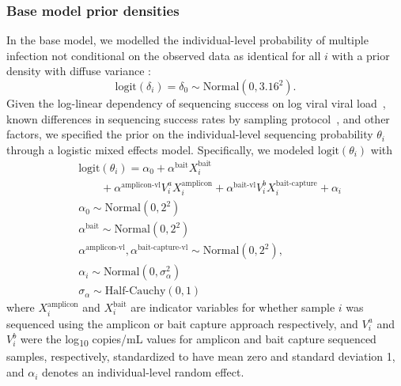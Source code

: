 \documentclass[10pt,letterpaper]{article}
\begin{document}
\subsubsection{Base model prior densities}
In the base model, we modelled the individual-level probability of multiple infection not conditional on the observed data as identical for all $i$ with a prior density with diffuse variance \cite{stan2024}: 
\begin{equation}
\text{logit}\left(\delta_i\right) = \delta_0 \sim \text{Normal}(0,3.16^2).
\label{eq:model_prob_mi}
\end{equation}
Given the log-linear dependency of sequencing success on log viral viral load~\cite{bonsall2020}, known differences in sequencing success rates by sampling protocol~\cite{monod2023}, and other factors, we specified the prior on the individual-level sequencing probability $\theta_i$ through a logistic mixed effects model. Specifically, we modeled $\text{logit}(\theta_i)$ with 
\begin{equation}
\begin{split}
&\text{logit}\left(\theta_i\right) = 
\alpha_0 + \alpha^{\text{bait}} X^{\text{bait}}_i \\
&\quad\quad + \alpha^{\text{amplicon-vl}} V_i^a X^{\text{amplicon}}_i + \alpha^{\text{bait-vl}}V_i^b X^{\text{bait-capture}}_i + \alpha_i\\
& \alpha_0 \sim \text{Normal}(0,2^2) \\
& \alpha^{\text{bait}} \sim \text{Normal}(0,2^2) \\
& \alpha^{\text{amplicon-vl}}, \alpha^{\text{bait-capture-vl}} \sim \text{Normal}(0,2^2),\\
& \alpha_i \sim \text{Normal}(0, \sigma_{\alpha}^2) \\
& \sigma_{\alpha} \sim \text{Half-Cauchy}(0,1)
\end{split}
\end{equation}
where $X^{\text{amplicon}}_i$ and $X^{\text{bait}}_i$ are indicator variables for whether sample $i$ was sequenced using the amplicon or bait capture approach respectively, and $V_i^a$ and $V_i^b$ were the log\textsubscript{10} copies/mL values for amplicon and bait capture sequenced samples, respectively, standardized to have mean zero and standard deviation 1, and $\alpha_i$ denotes an individual-level random effect. 
\end{document}
